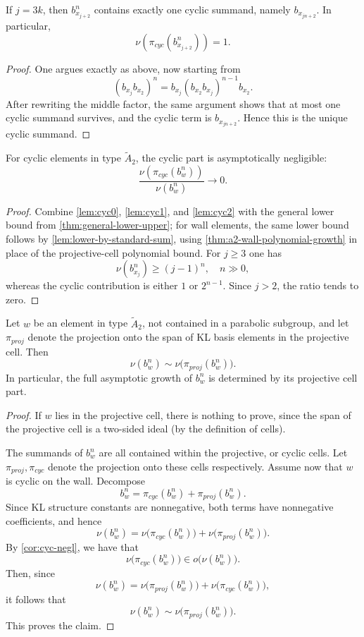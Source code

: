 \documentclass[a4paper,11pt]{amsart}
\newcommand{\nuop}{\nu}
\numberwithin{equation}{subsection}
\theoremstyle{definition}
\theoremstyle{remark}
\begin{document}
\begin{Lemma}\label{lem:cyc2}
If $j=3k$, then $b_{x_{j+2}}^n$ contains exactly one cyclic summand, namely $b_{x_{jn+2}}$. In particular,
\[
\nu(\pi_{cyc}(b_{x_{j+2}}^n))=1.
\]
\end{Lemma}

\begin{proof}
One argues exactly as above, now starting from
\[
(b_{x_j}b_{x_2})^n=b_{x_j}(b_{x_2}b_{x_j})^{n-1}b_{x_2}.
\]
After rewriting the middle factor, the same argument shows that at most one cyclic summand survives, and the cyclic term is $b_{x_{jn+2}}$. Hence this is the unique cyclic summand.
\end{proof}

\begin{Lemma}\label{cor:cyc-negl}
For cyclic elements in type $\widetilde A_2$, the cyclic part is asymptotically negligible:
\[
\frac{\nu(\pi_{cyc}(b_w^n))}{\nuop(b_w^n)}\longrightarrow 0.
\]
\end{Lemma}

\begin{proof}
Combine \autoref{lem:cyc0}, \autoref{lem:cyc1}, and
\autoref{lem:cyc2} with the general lower bound from
\autoref{thm:general-lower-upper}; for wall elements, the same lower bound
follows by \autoref{lem:lower-by-standard-sum}, using
\autoref{thm:a2-wall-polynomial-growth} in place of the projective-cell
polynomial bound. For $j\geq 3$ one has
\[
\nuop(b_{x_j}^n)\geq (j-1)^n,\quad n\gg 0,
\]
whereas the cyclic contribution is either $1$ or $2^{n-1}$. Since $j>2$, the ratio tends to zero.
\end{proof}

\begin{Lemma}\label{prop:a2reduction}
Let $w$ be an element in type $\widetilde A_2$, not contained in a parabolic subgroup, and let
$\pi_{proj}$
denote the projection onto the span of KL basis elements in the projective cell.
Then
\[
\nuop(b_w^n)\sim \nuop\bigl(\pi_{proj}(b_w^n)\bigr).
\]
In particular, the full asymptotic growth of $b_w^n$ is determined by its projective cell part.
\end{Lemma}

\begin{proof}
If $w$ lies in the projective cell, there is nothing to prove, since the span of the projective cell is a two-sided ideal (by the definition of cells).

The summands of $b_w^n$ are all contained within the projective, or cyclic cells. Let $\pi_{proj},\pi_{cyc}$ denote the projection onto these cells respectively.
Assume now that $w$ is cyclic on the wall. Decompose
\[
b_w^n=\pi_{cyc}(b_w^n)+\pi_{proj}(b_w^n).
\]
Since KL structure constants are nonnegative, both terms have nonnegative coefficients, and hence
\[
\nuop(b_w^n)
=
\nuop\bigl(\pi_{cyc}(b_w^n)\bigr)
+
\nuop\bigl(\pi_{proj}(b_w^n)\bigr).
\]
By \autoref{cor:cyc-negl}, we have that \[
\nuop\bigl(\pi_{cyc}(b_w^n)\bigr)
\in
o\bigl(\nuop(b_w^n)\bigr).
\]
Then, since
\[
\nuop(b_w^n)
=
\nuop\bigl(\pi_{proj}(b_w^n)\bigr)
+
\nuop\bigl(\pi_{cyc}(b_w^n)\bigr),
\]
it follows that
\[
\nuop(b_w^n)\sim \nuop\bigl(\pi_{proj}(b_w^n)\bigr).
\]
This proves the claim.
\end{proof}
\end{document}
